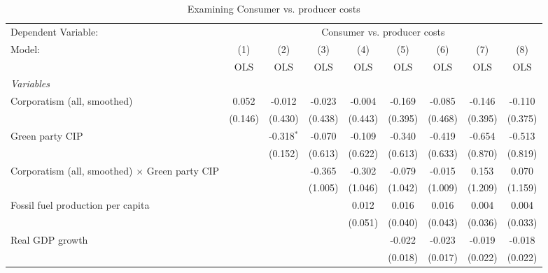 
\begin{table}[htbp]
   \caption{Examining Consumer vs. producer costs}
   \centering
   \begin{tabular}{lcccccccc}
      \toprule
      Dependent Variable: & \multicolumn{8}{c}{Consumer vs. producer costs}\\
      Model:                                                & (1)     & (2)          & (3)     & (4)     & (5)     & (6)     & (7)     & (8)\\  
                                                            &  OLS    & OLS          & OLS     & OLS     & OLS     & OLS     & OLS     & OLS\\  
      \midrule
      \emph{Variables}\\
      Corporatism (all, smoothed)                           & 0.052   & -0.012       & -0.023  & -0.004  & -0.169  & -0.085  & -0.146  & -0.110\\   
                                                            & (0.146) & (0.430)      & (0.438) & (0.443) & (0.395) & (0.468) & (0.395) & (0.375)\\   
      Green party CIP                                       &         & -0.318$^{*}$ & -0.070  & -0.109  & -0.340  & -0.419  & -0.654  & -0.513\\   
                                                            &         & (0.152)      & (0.613) & (0.622) & (0.613) & (0.633) & (0.870) & (0.819)\\   
      Corporatism (all, smoothed) $\times$ Green party CIP  &         &              & -0.365  & -0.302  & -0.079  & -0.015  & 0.153   & 0.070\\   
                                                            &         &              & (1.005) & (1.046) & (1.042) & (1.009) & (1.209) & (1.159)\\   
      Fossil fuel production per capita                     &         &              &         & 0.012   & 0.016   & 0.016   & 0.004   & 0.004\\   
                                                            &         &              &         & (0.051) & (0.040) & (0.043) & (0.036) & (0.033)\\   
      Real GDP growth                                       &         &              &         &         & -0.022  & -0.023  & -0.019  & -0.018\\   
                                                            &         &              &         &         & (0.018) & (0.017) & (0.022) & (0.022)\\   

\end{tabular}
\end{table}
